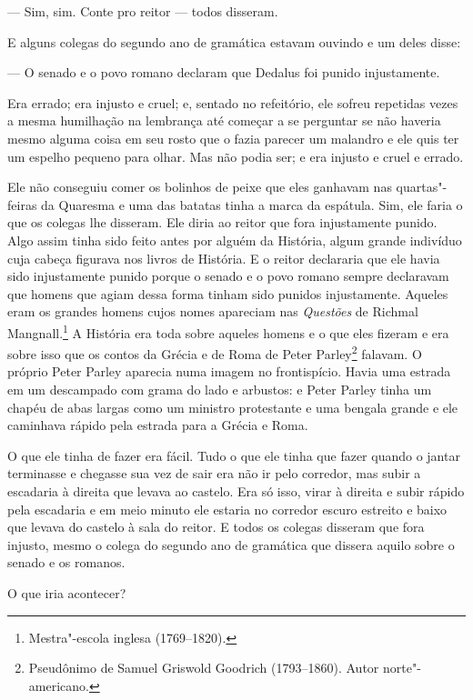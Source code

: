  --- Sim, sim. Conte pro reitor --- todos disseram.

E alguns colegas do segundo ano de gramática estavam ouvindo e um deles
disse:

 --- O senado e o povo romano declaram que Dedalus foi punido injustamente.

Era errado; era injusto e cruel; e, sentado no refeitório, ele sofreu
repetidas vezes a mesma humilhação na lembrança até começar a se
perguntar se não haveria mesmo alguma coisa em seu rosto que o fazia
parecer um malandro e ele quis ter um espelho pequeno para olhar. Mas
não podia ser; e era injusto e cruel e errado.

Ele não conseguiu comer os bolinhos de peixe que eles ganhavam nas
quartas"-feiras da Quaresma e uma das batatas tinha a marca da espátula.
Sim, ele faria o que os colegas lhe disseram. Ele diria ao reitor que
fora injustamente punido. Algo assim tinha sido feito antes por alguém
da História, algum grande indivíduo cuja cabeça figurava nos livros de
História. E o reitor declararia que ele havia sido injustamente punido
porque o senado e o povo romano sempre declaravam que homens que agiam
dessa forma tinham sido punidos injustamente. Aqueles eram os grandes
homens cujos nomes apareciam nas \textit{Questões} de Richmal Mangnall.\footnote{ Mestra"-escola inglesa (1769--1820).} A
História era toda sobre aqueles homens e o que eles fizeram e era sobre
isso que os contos da Grécia e de Roma de Peter Parley\footnote{ Pseudônimo de Samuel Griswold Goodrich (1793--1860). Autor norte"-americano.} falavam. O
próprio Peter Parley aparecia numa imagem no frontispício. Havia uma
estrada em um descampado com grama do lado e arbustos: e Peter Parley
tinha um chapéu de abas largas como um ministro protestante e uma
bengala grande e ele caminhava rápido pela estrada para a Grécia e
Roma.

O que ele tinha de fazer era fácil. Tudo o que ele tinha que fazer
quando o jantar terminasse e chegasse sua vez de sair era não ir pelo
corredor, mas subir a escadaria à direita que levava ao castelo. Era só
isso, virar à direita e subir rápido pela escadaria e em meio minuto
ele estaria no corredor escuro estreito e baixo que levava do castelo à
sala do reitor. E todos os colegas disseram que fora injusto, mesmo o
colega do segundo ano de gramática que dissera aquilo sobre o senado e
os romanos.

O que iria acontecer?

